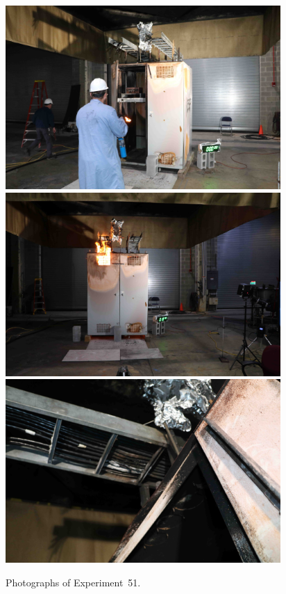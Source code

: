 \begin{figure}[p]
\centering
\includegraphics[height=2.75in]{../FIGURES/Test_51_setup} \\
\includegraphics[height=2.75in]{../FIGURES/Test_51_ignition} \\
\includegraphics[height=2.75in]{../FIGURES/Test_51_scar}
\caption[Photographs of Experiment~51]{Photographs of Experiment~51.}
\label{fig:Test_51_photos}
\end{figure}


\clearpage

